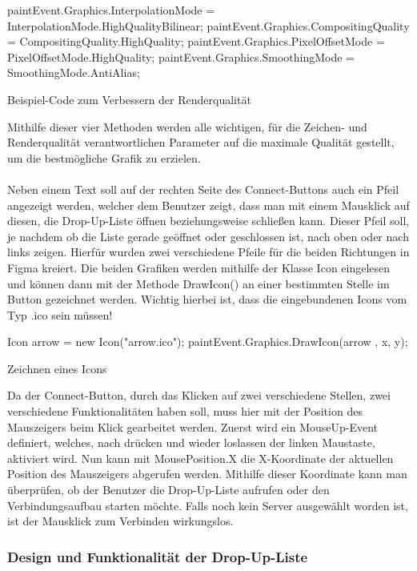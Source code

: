 \begin{program}[H]
\begin{CSharpCode}
paintEvent.Graphics.InterpolationMode = InterpolationMode.HighQualityBilinear;
paintEvent.Graphics.CompositingQuality = CompositingQuality.HighQuality;
paintEvent.Graphics.PixelOffsetMode = PixelOffsetMode.HighQuality;
paintEvent.Graphics.SmoothingMode = SmoothingMode.AntiAlias;
\end{CSharpCode}
\caption{Beispiel-Code zum Verbessern der Renderqualität}
\end{program}
\noindent 
Mithilfe dieser vier Methoden werden alle wichtigen, für die Zeichen- und Renderqualität verantwortlichen Parameter auf die maximale Qualität gestellt, um die bestmögliche Grafik zu erzielen. 
\\ \ \\
Neben einem Text soll auf der rechten Seite des Connect-Buttons auch ein Pfeil angezeigt werden, welcher dem Benutzer zeigt, dass man mit einem Mausklick auf diesen, die Drop-Up-Liste öffnen beziehungsweise schließen kann. Dieser Pfeil soll, je nachdem ob die Liste gerade geöffnet oder geschlossen ist, nach oben oder nach links zeigen. Hierfür wurden zwei verschiedene Pfeile für die beiden Richtungen in Figma kreiert. Die beiden Grafiken werden mithilfe der Klasse Icon eingelesen und können dann mit der Methode DrawIcon() an einer bestimmten Stelle im Button gezeichnet werden. Wichtig hierbei ist, dass die eingebundenen Icons vom Typ .ico sein müssen! 

\begin{program}[H]
\begin{CSharpCode}
Icon arrow = new Icon("arrow.ico");
paintEvent.Graphics.DrawIcon(arrow , x, y);
\end{CSharpCode}
\caption{Zeichnen eines Icons}
\end{program}
\noindent 
Da der Connect-Button, durch das Klicken auf zwei verschiedene Stellen, zwei verschiedene Funktionalitäten haben soll, muss hier mit der Position des Mauszeigers beim Klick gearbeitet werden. Zuerst wird ein MouseUp-Event definiert, welches, nach drücken und wieder loslassen der linken Maustaste, aktiviert wird. Nun kann mit MousePosition.X die X-Koordinate der aktuellen Position des Mauszeigers abgerufen werden. Mithilfe dieser Koordinate kann man überprüfen, ob der Benutzer die Drop-Up-Liste aufrufen oder den Verbindungsaufbau starten möchte. Falls noch kein Server ausgewählt worden ist, ist der Mausklick zum Verbinden wirkungslos.

\subsubsection{Design und Funktionalität der Drop-Up-Liste}

